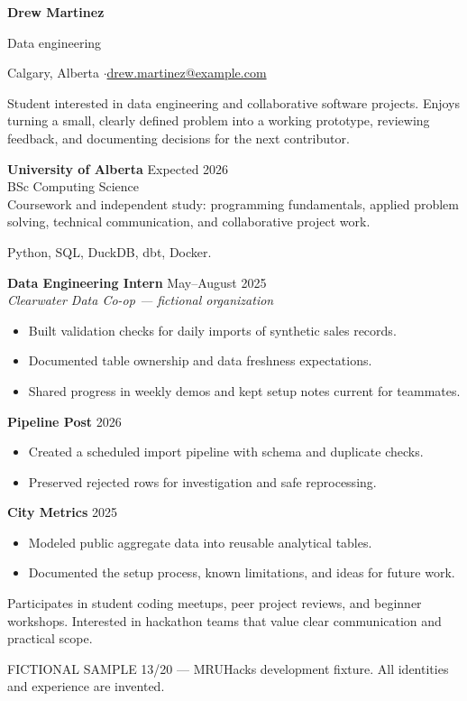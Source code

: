 
{\Huge\bfseries Drew Martinez}\par
{\large\color{accent} Data engineering}\par
Calgary, Alberta \enspace$\cdot$\enspace \href{mailto:drew.martinez@example.com}{drew.martinez@example.com}

Student interested in data engineering and collaborative software projects.
Enjoys turning a small, clearly defined problem into a working prototype,
reviewing feedback, and documenting decisions for the next contributor.

\textbf{University of Alberta} \hfill Expected 2026\\
BSc Computing Science\\
Coursework and independent study: programming fundamentals, applied problem solving,
technical communication, and collaborative project work.

Python, SQL, DuckDB, dbt, Docker.

\textbf{Data Engineering Intern} \hfill May--August 2025\\
\textit{Clearwater Data Co-op --- fictional organization}
\begin{itemize}
\item Built validation checks for daily imports of synthetic sales records.
\item Documented table ownership and data freshness expectations.
\item Shared progress in weekly demos and kept setup notes current for teammates.
\end{itemize}

\textbf{Pipeline Post} \hfill 2026
\begin{itemize}
\item Created a scheduled import pipeline with schema and duplicate checks.
\item Preserved rejected rows for investigation and safe reprocessing.
\end{itemize}
\textbf{City Metrics} \hfill 2025
\begin{itemize}
\item Modeled public aggregate data into reusable analytical tables.
\item Documented the setup process, known limitations, and ideas for future work.
\end{itemize}

Participates in student coding meetups, peer project reviews, and beginner workshops.
Interested in hackathon teams that value clear communication and practical scope.

\vfill
{\footnotesize\color{gray} FICTIONAL SAMPLE 13/20 --- MRUHacks development fixture.
All identities and experience are invented.}

